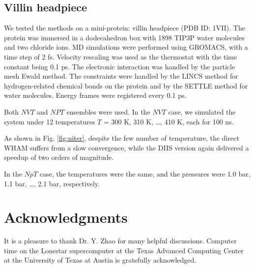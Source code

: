 \documentclass[reprint,superscriptaddress]{revtex4-1}
\begin{document}
\subsection{Villin headpiece}



We tested the methods on a mini-protein:
villin headpiece\cite{duan1998}
(PDB ID: 1VII).
%
The protein was immersed in
a dodecahedron box with 1898 TIP3P water molecules and two chloride ions.
%
MD simulations were performed
using GROMACS\cite{
  berendsen1995, *lindahl2001, *vanderspoel2005, *hess2008},
with a time step of 2 fs.
%
Velocity rescaling\cite{bussi2007}
was used as the thermostat with
the time constant being 0.1 ps.
%
The electronic interaction was
handled by the particle mesh Ewald method\cite{
  essmann1995}.
%
The constraints were handled by the LINCS method\cite{
  hess1997}
for hydrogen-related chemical bonds on the protein
and by the SETTLE method\cite{
  miyamoto1992}
for water molecules.
%
Energy frames were registered every 0.1 ps.



Both $NVT$ and $NPT$ ensembles were used.
%
In the $NVT$ case,
we simulated the system under 12 temperatures
$T$ = 300 K, 310 K, \dots, 410 K,
each for {\color{red} 100} ns.



As shown in Fig. \ref{fig:niter},
despite the few number of temperature,
the direct WHAM suffers from a slow convergence,
while the DIIS version again
delivered a speedup of two orders of magnitude.



In the $NpT$ case,
the temperatures were the same,
and the pressures were
1.0 bar, 1.1 bar, \dots, 2.1 bar,
respectively.





\section{Acknowledgments}





It is a pleasure to thank Dr. Y. Zhao
for many helpful discussions.
%
Computer time on the Lonestar supercomputer
at the Texas Advanced Computing Center
at the University of Texas at Austin
is gratefully acknowledged.




\end{document}
